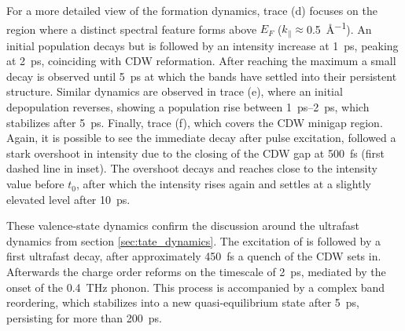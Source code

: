 For a more detailed view of the formation dynamics, trace (d) focuses on the region where a distinct spectral feature forms above $E_F$ ($k_\parallel\approx$\qty{0.5}{\angstrom^{-1}}).
An initial population decays but is followed by an intensity increase at \qty{1}{\pico\second}, peaking at \qty{2}{\pico\second}, coinciding with CDW reformation.
After reaching the maximum a small decay is observed until \qty{5}{\pico\second} at which the bands have settled into their persistent structure.
Similar dynamics are observed in trace (e), where an initial depopulation reverses, showing a population rise between \qtyrange{1}{2}{\pico\second}, which stabilizes after \qty{5}{\pico\second}.
Finally, trace (f), which covers the CDW minigap region.
Again, it is possible to see the immediate decay after pulse excitation, followed a stark overshoot in intensity due to the closing of the CDW gap at \qty{500}{\femto\second} (first dashed line in inset).
The overshoot decays and reaches close to the intensity value before $t_0$, after which the intensity rises again and settles at a slightly elevated level after \qty{10}{\pico\second}.

These valence-state dynamics confirm the discussion around the ultrafast dynamics from section \ref{sec:tate_dynamics}.
The excitation of  is followed by a first ultrafast decay, after approximately \qty{450}{\femto\second} a quench of the CDW sets in.
Afterwards the charge order reforms on the timescale of \qty{2}{\pico\second}, mediated by the onset of the \qty{0.4}{\tera\hertz} phonon.
This process is accompanied by a complex band reordering, which stabilizes into a new quasi-equilibrium state after \qty{5}{\pico\second}, persisting for more than \qty{200}{\pico\second}.

